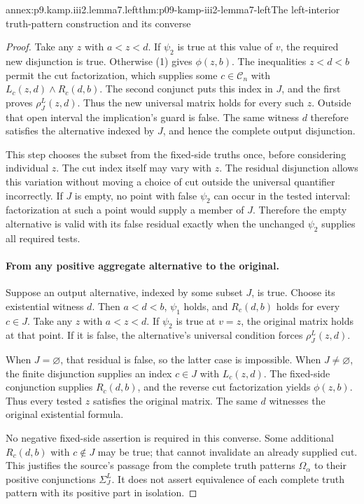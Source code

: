 \begin{annexitem}{annex:p9.kamp.iii2.lemma7.left}{thm:p09-kamp-iii2-lemma7-left}{The left-interior truth-pattern construction and its converse}
\begin{proof}
Take any \(z\) with \(a<z<d\). If \(\psi_2\) is
true at this value of \(v\), the required new disjunction is
true. Otherwise (1) gives \(\phi(z,b)\). The inequalities
\(z<d<b\) permit the cut factorization, which supplies some
\(c\in\mathcal C_n\) with
\(L_c(z,d)\land R_c(d,b)\). The second conjunct puts this
index in \(J\), and the first proves \(\rho_J^L(z,d)\).
Thus the new universal matrix holds for every such \(z\).
Outside that open interval the implication's guard is false.
The same witness \(d\) therefore satisfies the alternative
indexed by \(J\), and hence the complete output disjunction.

This step chooses the subset from the fixed-side truths once, before
considering individual \(z\). The cut index itself may vary
with \(z\). The residual disjunction allows this variation without
moving a choice of cut outside the universal quantifier incorrectly.
If \(J\) is empty, no point with false \(\psi_2\) can occur
in the tested interval: factorization at such a point would supply
a member of \(J\). Therefore the empty alternative is valid
with its false residual exactly when the unchanged \(\psi_2\)
supplies all required tests.

\paragraph{From any positive aggregate alternative to the original.}
Suppose an output alternative, indexed by some subset \(J\), is
true. Choose its existential witness \(d\). Then \(a<d<b\),
\(\psi_1\) holds, and \(R_c(d,b)\) holds for every
\(c\in J\). Take any \(z\) with \(a<z<d\).
If \(\psi_2\) is true at \(v=z\), the original matrix
holds at that point. If it is false, the alternative's universal
condition forces \(\rho_J^L(z,d)\).

When \(J=\varnothing\), that residual is false, so the latter
case is impossible. When \(J\ne\varnothing\), the finite
disjunction supplies an index \(c\in J\) with \(L_c(z,d)\).
The fixed-side conjunction supplies \(R_c(d,b)\), and the
reverse cut factorization yields \(\phi(z,b)\).
Thus every tested \(z\) satisfies the original matrix. The
same \(d\) witnesses the original existential formula.

No negative fixed-side assertion is required in this converse.
Some additional \(R_c(d,b)\) with \(c\notin J\) may be
true; that cannot invalidate an already supplied cut. This justifies
the source's passage from the complete truth patterns
\(\Omega_\alpha\) to their positive conjunctions
\(\Sigma_J^L\). It does not assert equivalence of each complete
truth pattern with its positive part in isolation.


\end{proof}
\end{annexitem}
